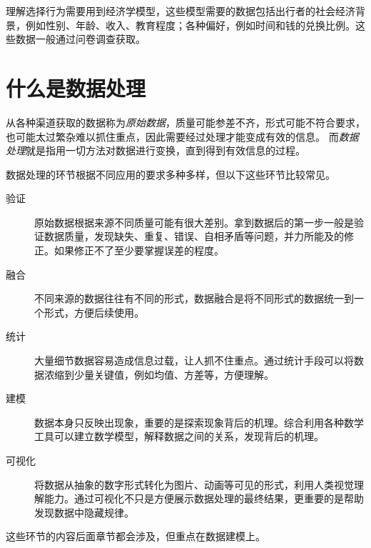 理解选择行为需要用到经济学模型，这些模型需要的数据包括出行者的社会经济背景，例如性别、年龄、收入、教育程度；各种偏好，例如时间和钱的兑换比例。这些数据一般通过问卷调查获取。

\section{什么是数据处理}

从各种渠道获取的数据称为\emph{原始数据}，质量可能参差不齐，形式可能不符合要求，也可能太过繁杂难以抓住重点，因此需要经过处理才能变成有效的信息。
而\emph{数据处理}就是指用一切方法对数据进行变换，直到得到有效信息的过程。

数据处理的环节根据不同应用的要求多种多样，但以下这些环节比较常见。
\begin{description}
    \item[验证] 原始数据根据来源不同质量可能有很大差别。拿到数据后的第一步一般是验证数据质量，发现缺失、重复、错误、自相矛盾等问题，并力所能及的修正。如果修正不了至少要掌握误差的程度。
    \item[融合] 不同来源的数据往往有不同的形式，数据融合是将不同形式的数据统一到一个形式，方便后续使用。
    \item[统计] 大量细节数据容易造成信息过载，让人抓不住重点。通过统计手段可以将数据浓缩到少量关键值，例如均值、方差等，方便理解。
    \item[建模] 数据本身只反映出现象，重要的是探索现象背后的机理。综合利用各种数学工具可以建立数学模型，解释数据之间的关系，发现背后的机理。
    \item[可视化] 将数据从抽象的数字形式转化为图片、动画等可见的形式，利用人类视觉理解能力。通过可视化不只是方便展示数据处理的最终结果，更重要的是帮助发现数据中隐藏规律。
\end{description}
这些环节的内容后面章节都会涉及，但重点在数据建模上。